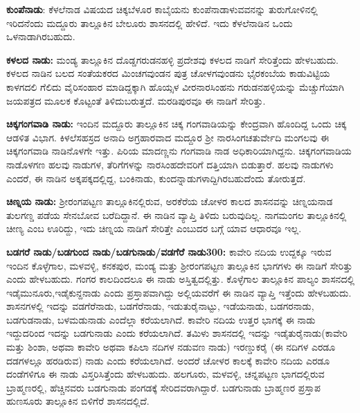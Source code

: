 \textbf{ಕುಂಪೆನಾಡು}: ಕೆಳಲೆನಾಡ ವಿಷಯದ ಚಿಕ್ಕಬೆಳೂರ ಕಾಬೈಯನು ಕುಂಪೆನಾಡಾಳುವವನನ್ನು ತುರುಗೋಳಿನಲ್ಲಿ ಇರಿದನೆಂದು ಮದ್ದೂರು ತಾಲ್ಲೂಕಿನ ಬೇಲೂರು ಶಾಸನದಲ್ಲಿ ಹೇಳಿದೆ. ಇದು ಕೆಳಲೆನಾಡಿನ ಒಂದು ಒಳನಾಡಾಗಿರಬಹುದು.

\textbf{ಕಳಲದ ನಾಡು:} ಮಂಡ್ಯ ತಾಲ್ಲೂಕಿನ ದೊಡ್ಡಗರುಡನಹಳ್ಳಿ ಪ್ರದೇಶವು ಕಳಲದ ನಾಡಿಗೆ ಸೇರಿತ್ತೆಂದು ಹೇಳಬಹುದು. ಕಳಲದ ನಾಡಿನ ಬಲದ ಸಂತೆಯಕರದ ಮಿಂಚಗವುಂಡನ ಪುತ್ರ ಚೋಳಗವುಂಡನು ಭೈರಕಂಬೆಯ ಕಾಡುವಿಟ್ಟಿಯ ಕಾಳಗದಲಿ ಗೆಲಿದು ವೈರಿಸಂಹಾರ ಮಾಡಿದ್ದಕ್ಕಾಗಿ ಹೊಯ್ಸಳ ವೀರನಾರಸಿಂಹನು ಗರುಡನಹಳ್ಳಿಯನ್ನು ಮೆಚ್ಚುಗೆಯಾಗಿ ಜಯಪತ್ರದ ಮೂಲಕ ಕೊಟ್ಟಂತೆ ತಿಳಿದುಬರುತ್ತದೆ. ಮರಡಿಪುರವೂ ಈ ನಾಡಿಗೆ ಸೇರಿತ್ತು.

\textbf{ಚಿಕ್ಕಗಂಗವಾಡಿ ನಾಡು:} ಇಂದಿನ ಮದ್ದೂರು ತಾಲ್ಲೂಕಿನ ಚಿಕ್ಕ ಗಂಗವಾಡಿಯನ್ನು ಕೇಂದ್ರವಾಗಿ ಹೊಂದಿದ್ದ ಒಂದು ಚಿಕ್ಕ ಆಡಳಿತ ವಿಭಾಗ. ಕಿಳಲೆಸಹಸ್ರದ ಅನಾದಿ ಅಗ್ರಹಾರವಾದ ಮದ್ದೂರ ಶ‍್ರೀ ನಾರಸಿಂಗಚತುರ್ವೇದಿ ಮಂಗಲವು ಈ ಚಿಕ್ಕಗಂಗವಾಡಿ ನಾಡಿನೊಳಗೇ ಇತ್ತು. ಪಿರಿಯ ಮಾದಣ್ಣನು ಗಂಗವಾಡಿ ನಾಡ ಅಧಿಕಾರಿಯಾಗಿದ್ದನು. ಚಿಕ್ಕಗಂಗವಾಡಿಯ ನಾಡೊಳಗಣ ಹಲವು ನಾಡುಗಳ, ತೆರಿಗೆಗಳನ್ನು ನಾರಸಿಂಹದೇವರಿಗೆ ದತ್ತಿಯಾಗಿ ಬಿಡುತ್ತಾರೆ. ಹಲವು ನಾಡುಗಳು ಎಂದರೆ, ಈ ನಾಡಿನ ಅಕ್ಕಪಕ್ಕದಲ್ಲಿದ್ದ, ಬಂಕಿನಾಡು, ಕುಂದನ್ನಾಡುಗಳಾದ್ದಿಗಿರಬಹುದೆಂದು ತೋರುತ್ತದೆ.

\textbf{ಚಿಣ್ನಯ ನಾಡು:} ಶ‍್ರೀರಂಗಪಟ್ಟಣ ತಾಲ್ಲೂಕಿನಲ್ಲಿರುವ, ಅರಕೆರೆಯ ಚೋಳರ ಕಾಲದ ಶಾಸನವನ್ನು ಚಿಣ್ನಯನಾಡ ತುಲಗಣ್ಡ ಪಡೆಯ ಸೇನಬೋವ ಬರೆದಿದ್ದಾನೆ. ಈ ನಾಡಿನ ವ್ಯಾಪ್ತಿ ತಿಳಿದು ಬರುವುದಿಲ್ಲ. ನಾಗಮಂಗಲ ತಾಲ್ಲೂಕಿನಲ್ಲಿ ಚೀಣ್ಯ ಎಂಬ ಊರಿದ್ದು, ಇದು ಚಿಣ್ನಯ ನಾಡಿಗೆ ಸೇರಿತ್ತೇ ಎಂಬುದರ ಬಗ್ಗೆ ಯಾವ ಆಧಾರವೂ ಇಲ್ಲ.

\textbf{ಬಡಗರೆ ನಾಡು/ಬಡಗುಂದ ನಾಡು/ಬಡಗುನಾಡು/ವಡಗೆರೆ ನಾಡು}\enginline{-}\textbf{300:} ಕಾವೇರಿ ನದಿಯ ಉದ್ದಕ್ಕೂ ಇರುವ ಇಂದಿನ ಕೊಳ್ಳೆಗಾಲ, ಮಳವಳ್ಳಿ, ಕನಕಪುರ, ಮಂಡ್ಯ ಮತ್ತು ಶ‍್ರೀರಂಗಪಟ್ಟಣ ತಾಲ್ಲೂಕಿನ ಭಾಗಗಳು ಈ ನಾಡಿಗೆ ಸೇರಿತ್ತು ಎಂದು ಹೇಳಬಹುದು. ಗಂಗರ ಕಾಲದಿಂದಲೂ ಈ ನಾಡು ಅಸ್ತಿತ್ವದಲ್ಲಿತ್ತು. ಕೊಳ್ಳೆಗಾಲ ತಾಲ್ಲೂಕಿನ ಪಾಲ್ಯಂ ಶಾಸನದಲ್ಲಿ ಇಡೈಮುನೂರು,ಇಡೈಕುನ್ದನಾಡು ಎಂದು ಪ್ರಸ್ತಾಪವಾಗಿದ್ದು ಅಲ್ಲಿಯವರೆಗೆ ಈ ನಾಡಿನ ವ್ಯಾಪ್ತಿ ಇತ್ತೆಂದು ಹೇಳಬಹುದು. ಶಾಸನಗಳಲ್ಲಿ ಇದನ್ನು ವಡಗೆರೆನಾಡು, ಬಡಗೆರೆನಾಡು, ಇಡುತುರೈನಾಟ್ಟು, ಇಡೆಯನಾಡು, ಬಡಗರನಾಡು, ಬಡಗುಡನಾಡು, ಬಳಮಡುನಾಡು ಎಂದೆಲ್ಲಾ ಕರೆಯಲಾಗಿದೆ. ಕಾವೇರಿ ನದಿಯ ಉತ್ತರ ಭಾಗಕ್ಕೆ ಈ ನಾಡು ಇದ್ದುದರಿಂದ ಇದನ್ನು ಬಡಗುನಾಡು ಎಂದು ಕರೆಯಲಾಗಿದೆ. ತಮಿಳು ಶಾಸನದಲ್ಲಿ ಇದನ್ನು ಇಡೈತುರೈನಾಡು(ಕಾವೇರಿ ಮತ್ತು ಶಿಂಶಾ, ಅಥವಾ ಕಾವೇರಿ ಅಥವಾ ಕಪಿಲಾ ನದಿಗಳ ನಡುವಣ ನಾಡು) ಇರಣ್ಡುಕರೈ (ಈ ನದಿಗಳ ಎರಡೂ ದಡಗಳಲ್ಲೂ ಹರಡಿರುವ) ನಾಡು ಎಂದು ಕರೆಯಲಾಗಿದೆ. ಅಂದರೆ ಚೋಳರ ಕಾಲಕ್ಕೆ ಕಾವೇರಿ ನದಿಯ ಎರಡೂ ದಂಡೆಗಳಿಗೂ ಈ ನಾಡು ವಿಸ್ತರಿಸಿತ್ತೆಂದು ಹೇಳಬಹುದು. ಹಲಗೂರು, ಮಳವಳ್ಳಿ, ಚನ್ನಪಟ್ಟಣ ಭಾಗದಲ್ಲಿರುವ ಬ್ರಾಹ್ಮಣರಲ್ಲಿ, ಹೆಚ್ಚಿನವರು ಬಡಗುನಾಡು ಪಂಗಡಕ್ಕೆ ಸೇರಿದವರಾಗಿದ್ದಾರೆ. ಬಡಗುನಾಡು ಬ್ರಾಹ್ಮಣರ ಪ್ರಸ್ತಾಪ ಹುಣಸೂರು ತಾಲ್ಲೂಕಿನ ಬಿಳಿಗೆರೆ ಶಾಸನದಲ್ಲಿದೆ.

